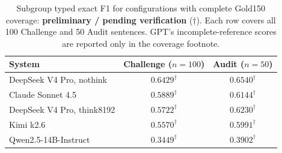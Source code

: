 \begin{table}[htbp]
\centering
\small
\caption{Subgroup typed exact F1 for configurations with complete Gold150 coverage: \textbf{preliminary / pending verification} ($\dagger$). Each row covers all 100 Challenge and 50 Audit sentences. GPT's incomplete-reference scores are reported only in the coverage footnote.}
\label{tab:gold150-shared-subsets-r7}
\begin{tabular*}{\linewidth}{@{\extracolsep{\fill}}lcc@{}}
\toprule
System & Challenge ($n=100$) & Audit ($n=50$) \\
\midrule
DeepSeek V4 Pro, nothink & $0.6429^{\dagger}$ & $0.6540^{\dagger}$ \\
Claude Sonnet 4.5 & $0.5889^{\dagger}$ & $0.6144^{\dagger}$ \\
DeepSeek V4 Pro, think8192 & $0.5722^{\dagger}$ & $0.6230^{\dagger}$ \\
Kimi k2.6 & $0.5570^{\dagger}$ & $0.5991^{\dagger}$ \\
Qwen2.5-14B-Instruct & $0.3449^{\dagger}$ & $0.3902^{\dagger}$ \\
\bottomrule
\end{tabular*}
\end{table}
